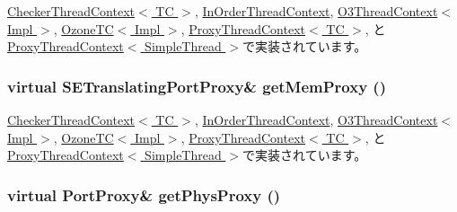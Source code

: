 \hyperlink{classCheckerThreadContext_a3faa5e314c06241296ab582bb891a06a}{CheckerThreadContext$<$ TC $>$}, \hyperlink{classInOrderThreadContext_a3faa5e314c06241296ab582bb891a06a}{InOrderThreadContext}, \hyperlink{classO3ThreadContext_ab24a9f94beeda4c4a7bcf576a75be32a}{O3ThreadContext$<$ Impl $>$}, \hyperlink{classOzoneCPU_1_1OzoneTC_a3faa5e314c06241296ab582bb891a06a}{OzoneTC$<$ Impl $>$}, \hyperlink{classProxyThreadContext_a3faa5e314c06241296ab582bb891a06a}{ProxyThreadContext$<$ TC $>$}, と \hyperlink{classProxyThreadContext_a3faa5e314c06241296ab582bb891a06a}{ProxyThreadContext$<$ SimpleThread $>$}で実装されています。\hypertarget{classThreadContext_a840e8764d04f2a3fb061c56738f3a874}{
\subsubsection[{getMemProxy}]{\setlength{\rightskip}{0pt plus 5cm}virtual {\bf SETranslatingPortProxy}\& getMemProxy ()}}
\label{classThreadContext_a840e8764d04f2a3fb061c56738f3a874}


\hyperlink{classCheckerThreadContext_ab07f5af63c9d22e504dfe620c0a07228}{CheckerThreadContext$<$ TC $>$}, \hyperlink{classInOrderThreadContext_ab07f5af63c9d22e504dfe620c0a07228}{InOrderThreadContext}, \hyperlink{classO3ThreadContext_ae9d873744bcdc5b96477b0b31369de82}{O3ThreadContext$<$ Impl $>$}, \hyperlink{classOzoneCPU_1_1OzoneTC_ab07f5af63c9d22e504dfe620c0a07228}{OzoneTC$<$ Impl $>$}, \hyperlink{classProxyThreadContext_ab07f5af63c9d22e504dfe620c0a07228}{ProxyThreadContext$<$ TC $>$}, と \hyperlink{classProxyThreadContext_ab07f5af63c9d22e504dfe620c0a07228}{ProxyThreadContext$<$ SimpleThread $>$}で実装されています。\hypertarget{classThreadContext_a2c278159cd0cf8983446313f71dad2b4}{
\subsubsection[{getPhysProxy}]{\setlength{\rightskip}{0pt plus 5cm}virtual {\bf PortProxy}\& getPhysProxy ()}}
\label{classThreadContext_a2c278159cd0cf8983446313f71dad2b4}


